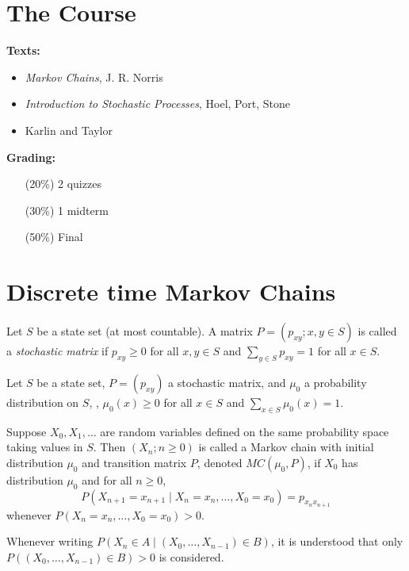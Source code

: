 
\setcounter{section}{-1}
\section{The Course} \label{sec:course}
\textbf{Texts:} \begin{itemize}
    \item \textit{Markov Chains}, J. R. Norris
    \item \textit{Introduction to Stochastic Processes}, Hoel, Port, Stone
    \item Karlin and Taylor
\end{itemize}

\textbf{Grading:} \begin{itemize}
    \item[(20\%)] 2 quizzes
    \item[(30\%)] 1 midterm
    \item[(50\%)] Final
\end{itemize}

\section{Discrete time Markov Chains} \label{sec:dtmc}
\begin{definition}
    Let $S$ be a state set (at most countable).
    A matrix $P = (p_{xy}; x, y \in S)$ is called a \emph{stochastic matrix}
    if $p_{xy} \ge 0$ for all $x, y \in S$ and $\sum_{y \in S} p_{xy} = 1$
    for all $x \in S$.
\end{definition}

\begin{definition}
    Let $S$ be a state set, $P = (p_{xy})$ a stochastic matrix, and $\mu_0$
    a probability distribution on $S$, \ie, $\mu_0(x) \ge 0$ for all
    $x \in S$ and $\sum_{x \in S} \mu_0(x) = 1$.

    Suppose $X_0, X_1, \dots$ are random variables defined on the same
    probability space taking values in $S$.
    Then $(X_n; n \ge 0)$ is called a Markov chain with initial distribution
    $\mu_0$ and transition matrix $P$, denoted $MC(\mu_0, P)$, if $X_0$ has
    distribution $\mu_0$ and for all $n \ge 0$, \[
        P(X_{n+1} = x_{n+1} \mid X_n = x_n, \dots, X_0 = x_0)
            = p_{x_n x_{n+1}}
    \] whenever $P(X_n = x_n, \dots, X_0 = x_0) > 0$.
\end{definition}
\begin{notation}
    Whenever writing $P(X_n \in A \mid (X_0, \dots, X_{n-1}) \in B)$, it is
    understood that only $P((X_0, \dots, X_{n-1}) \in B) > 0$ is considered.
\end{notation}

